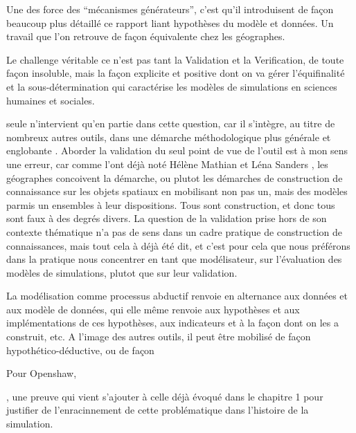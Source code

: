 
Une des force des \enquote{mécanismes générateurs}, c'est qu'il introduisent de façon beaucoup plus détaillé ce rapport liant hypothèses du modèle et données. Un travail que l'on retrouve de façon équivalente chez les géographes.

Le challenge véritable ce n'est pas tant la Validation et la Verification, de toute façon insoluble, mais la façon explicite et positive dont on va gérer l'équifinalité et la sous-détermination qui caractérise les modèles de simulations en sciences humaines et sociales.



seule n'intervient qu'en partie dans cette question, car il s'intègre, au titre de nombreux autres outils, dans une démarche méthodologique plus générale et englobante \autocite{}. Aborder la validation du seul point de vue de l'outil est à mon sens une erreur, car comme l'ont déjà noté Hélène Mathian et Léna Sanders , les géographes concoivent la démarche, ou plutot les démarches de construction de connaissance sur les objets spatiaux en mobilisant non pas un, mais des modèles parmis un ensembles à leur dispositions. Tous sont construction, et donc tous sont faux à des degrés divers. La question de la validation prise hors de son contexte thématique n'a pas de sens dans un cadre pratique de construction de connaissances, mais tout cela à déjà été dit, et c'est pour cela que nous préférons dans la pratique nous concentrer en tant que modélisateur, sur l'évaluation des modèles de simulations, plutot que sur leur validation. \autocite{Amblard2006}


La modélisation comme processus abductif renvoie en alternance aux données et aux modèle de données, qui elle même renvoie aux hypothèses et aux implémentations de ces hypothèses, aux indicateurs et à la façon dont on les a construit, etc. A l'image des autres outils, il peut être mobilisé de façon hypothético-déductive, ou de façon 


Pour Openshaw, 

, une preuve qui vient s'ajouter à celle déjà évoqué dans le chapitre 1 pour justifier de l'enracinnement de cette problématique dans l'histoire de la simulation.


